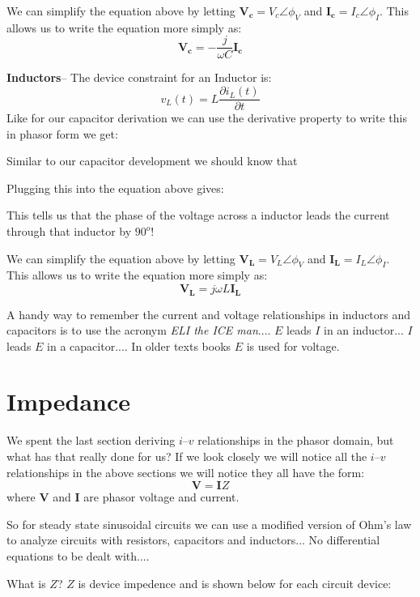 \documentclass{handout}
\begin{document}
We can simplify the equation above by letting $\mathbf{V_c} = V_c\angle \phi_V$ and $\mathbf{I_c} = I_c\angle \phi_I$.  This allows us to write the equation more simply as:
\[
\mathbf{V_c}  = -\frac{j}{\omega C}\mathbf{I_c}
\]

\textbf{Inductors}-- The device constraint for an Inductor is:
\[
v_L(t) = L\frac{\partial i_L(t)}{\partial t}
\]
Like for our capacitor derivation we can use the derivative property to write this in phasor form we get:
\soln{2in}{
\[
V_L\angle \phi_V =j\omega L  I_L \angle \phi_I
\]
}

Similar to our capacitor development we should know that
\soln{1in}{
\[
j\omega L = \omega L \angle 90^o
\]
}

Plugging this into the equation above gives:
\soln{1in}{
\[
V_L\angle \phi_V =\omega L \angle 90^o  I_L \angle \phi_I=\omega L I_L \angle \left(\phi_I+90^o \right)
\]
}

This tells us that the phase of the voltage across a inductor leads the current through that inductor by $90^o$!

We can simplify the equation above by letting $\mathbf{V_L} = V_L\angle \phi_V$ and $\mathbf{I_L} = I_L\angle \phi_I$.  This allows us to write the equation more simply as:
\[
\mathbf{V_L}  = j\omega L\mathbf{I_L}
\]



A handy way to remember the current and voltage relationships in inductors and capacitors is to use the acronym {\em ELI the ICE man}.... $E$ leads $I$ in an inductor... $I$ leads $E$ in a capacitor.... In older texts books $E$ is used for voltage.
\newpage
\clearpage
\pagebreak
\section{Impedance}
We spent the last section deriving $i$--$v$ relationships in the phasor domain, but what has that really done for us?  If we look closely we will notice all the $i$--$v$ relationships in the above sections we will notice they all have the form:
\[
\mathbf{V} = \mathbf{I}Z
\]
where $\mathbf{V}$ and $\mathbf{I}$ are phasor voltage and current.

So for steady state sinusoidal circuits we can use a modified version of Ohm's law to analyze circuits with resistors, capacitors and inductors... No differential equations to be dealt with....

What is $Z$?  $Z$ is device impedence and is shown below for each circuit device:
\soln{2in}{
\[
Z_R = R
\]
\[
Z_C = -\frac{j}{\omega C} = \frac{1}{j\omega C}
\]
\[
Z_L = j\omega L
\]
}
\end{document}
